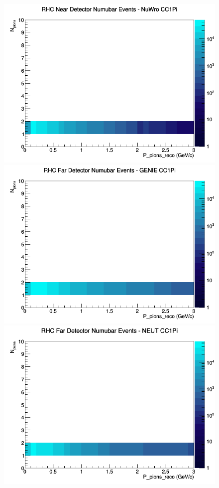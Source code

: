 \documentclass[12pt]{article}
\begin{document}
\begin{figure}[h]
\includegraphics[width=\linewidth]{eff_N_P/FGT/pions/CC1Pi_RHC_ND_numubar_N_P_NuWro.png}
\endminipage
\newline
{}
\includegraphics[width=\linewidth]{eff_N_P/FGT/pions/CC1Pi_RHC_FD_numubar_N_P_GENIE.png}
\endminipage
{}
\includegraphics[width=\linewidth]{eff_N_P/FGT/pions/CC1Pi_RHC_FD_numubar_N_P_NEUT.png}

\end{figure}
\end{document}
